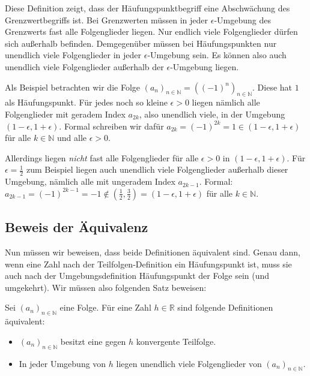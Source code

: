 \documentclass[fontsize=9pt,
               parskip=half-,
               DIV=14,
               listof=chapterentry,
               tocflat]{scrbook}
\begin{document}
Diese Definition zeigt, dass der Häufungspunktbegriff eine Abschwächung des Grenzwertbegriffs ist. Bei Grenzwerten müssen in jeder $\epsilon $-Umgebung des Grenzwerts fast alle Folgenglieder liegen. Nur endlich viele Folgenglieder dürfen sich außerhalb befinden. Demgegenüber müssen bei Häufungspunkten nur unendlich viele Folgenglieder in jeder $\epsilon $-Umgebung sein. Es können also auch unendlich viele Folgenglieder außerhalb der $\epsilon $-Umgebung liegen.

\begin{example*}
Als Beispiel betrachten wir die Folge $(a_{n})_{n\in \mathbb {N} }=((-1)^{n})_{n\in \mathbb {N} }$. Diese hat $1$ als Häufungspunkt. Für jedes noch so kleine $\epsilon >0$ liegen nämlich alle Folgenglieder mit geradem Index $a_{2k}$, also unendlich viele, in der Umgebung $(1-\epsilon ,1+\epsilon )$. Formal schreiben wir dafür $a_{2k}=(-1)^{2k}=1\in (1-\epsilon ,1+\epsilon )$ für alle $k\in \mathbb {N} $ und alle $\epsilon >0$.

Allerdings liegen \emph{nicht} fast alle Folgenglieder für alle $\epsilon >0$ in $(1-\epsilon ,1+\epsilon )$. Für $\epsilon ={\tfrac {1}{2}}$ zum Beispiel liegen auch unendlich viele Folgenglieder außerhalb dieser Umgebung, nämlich alle mit ungeradem Index $a_{2k-1}$. Formal: $a_{2k-1}=(-1)^{2k-1}=-1\notin ({\tfrac {1}{2}},{\tfrac {3}{2}})=(1-\epsilon ,1+\epsilon )$ für alle $k\in \mathbb {N} $.

\end{example*}

\subsection{Beweis der Äquivalenz}

Nun müssen wir beweisen, dass beide Definitionen äquivalent sind. Genau dann, wenn eine Zahl nach der Teilfolgen-Definition ein Häufungspunkt ist, muss sie auch nach der Umgebungsdefinition Häufungspunkt der Folge sein (und umgekehrt). Wir müssen also folgenden Satz beweisen:

\begin{theorem*}
Sei $(a_{n})_{n\in \mathbb {N} }$ eine Folge. Für eine Zahl $h\in \mathbb {R} $ sind folgende Definitionen äquivalent:

\begin{itemize}
\item $(a_{n})_{n\in \mathbb {N} }$ besitzt eine gegen $h$ konvergente Teilfolge.
\item In jeder Umgebung von $h$ liegen unendlich viele Folgenglieder von $(a_{n})_{n\in \mathbb {N} }$.
\end{itemize}

\end{theorem*}
\end{document}
